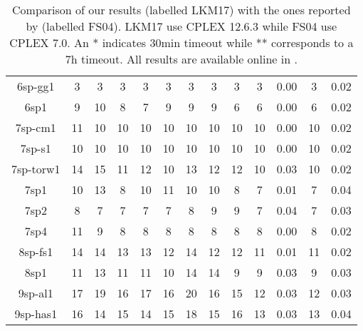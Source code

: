 \begin{table}
\begin{adjustbox}{center}
\begin{tabular}{|ccccccccccccc|}
6sp-gg1 & 3 & 3 & 3 & 3 & 3 & 3 & 3 & 3 & 3 & 0.00 & 3 & 0.02 \\ 
6sp1 & 9 & 10 & 8 & 7 & 9 & 9 & 9 & 6 & 6 & 0.00 & 6 & 0.02 \\ 
7sp-cm1 & 11 & 10 & 10 & 10 & 10 & 10 & 10 & 10 & 10 & 0.00 & 10 & 0.02 \\ 
7sp-s1 & 10 & 10 & 10 & 10 & 10 & 10 & 10 & 10 & 10 & 0.00 & 10 & 0.02 \\ 
7sp-torw1 & 14 & 15 & 11 & 12 & 10 & 13 & 12 & 12 & 10 & 0.03 & 10 & 0.02 \\ 
7sp1 & 10 & 13 & 8 & 10 & 11 & 10 & 10 & 8 & 7 & 0.01 & 7 & 0.04 \\ 
7sp2 & 8 & 7 & 7 & 7 & 7 & 8 & 9 & 9 & 7 & 0.04 & 7 & 0.03 \\ 
7sp4 & 11 & 9 & 8 & 8 & 8 & 8 & 8 & 8 & 8 & 0.00 & 8 & 0.02 \\ 
8sp-fs1 & 14 & 14 & 13 & 13 & 12 & 14 & 12 & 12 & 11 & 0.01 & 11 & 0.02 \\ 
8sp1 & 11 & 13 & 11 & 11 & 10 & 14 & 14 & 9 & 9 & 0.03 & 9 & 0.03 \\ 
9sp-al1 & 17 & 19 & 16 & 17 & 16 & 20 & 16 & 15 & 12 & 0.03 & 12 & 0.03 \\ 
9sp-has1 & 16 & 14 & 15 & 14 & 15 & 18 & 15 & 16 & 13 & 0.03 & 13 & 0.04 \\ 
\hline 
\end{tabular} 
\end{adjustbox} 
\vspace*{-0.2cm} 
\caption{Comparison of our results (labelled LKM17) with the ones reported by \citet{furman:2004} (labelled FS04). LKM17 use CPLEX 12.6.3 while FS04 use CPLEX 7.0. An * indicates 30min timeout while ** corresponds to a 7h timeout. All results are available online in \cite{source_code}.} 
\label{Table:Comparisons} 
\end{table} 
